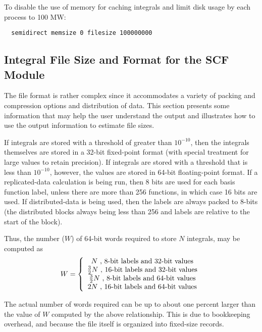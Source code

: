 To disable the use of memory for caching integrals and limit disk
usage by each process to 100 MW:
\begin{verbatim}
  semidirect memsize 0 filesize 100000000
\end{verbatim}


\subsection{Integral File Size and Format for the SCF Module}

The file format is rather complex since it accommodates a variety of
packing and compression options and distribution of data.  This
section presents some information that may help the user understand
the output and illustrates how to use the output information to
estimate file sizes.

If integrals are stored with a threshold of greater than $10^{-10}$,
then the integrals themselves are stored in a 32-bit fixed-point
format (with special treatment for large values to retain precision).
If integrals are stored with a threshold that is less than $10^{-10}$,
however, the values are stored in 64-bit floating-point format.  If a
replicated-data calculation is being run, then 8 bits are used for
each basis function label, unless there are more than 256 functions,
in which case 16 bits are used.  If distributed-data is being used,
then the labels are always packed to 8-bits (the distributed blocks
always being less than 256 and labels are relative to the start of the
block).

Thus, the number ($W$) of 64-bit words required to store $N$
integrals, may be computed as
\begin{displaymath}
  W = \left\{ \\
      \begin{array}{c}
        N \mbox{ , 8-bit labels and 32-bit values} \\
        \frac{3}{2}N \mbox{ , 16-bit labels and 32-bit values} \\
        \frac{3}{2}N \mbox{ , 8-bit labels and 64-bit values} \\
        2N \mbox{ , 16-bit labels and 64-bit values} 
      \end{array}
      \right.
\end{displaymath}

The actual number of words required can be up to about one percent
larger than the value of $W$ computed by the above relationship.  This
is due to bookkeeping overhead, and because the file itself is
organized into fixed-size records.


